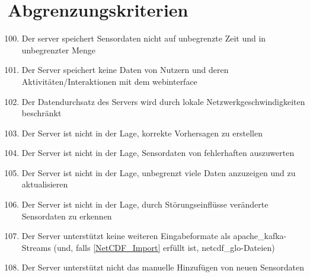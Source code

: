 \section{Abgrenzungskriterien}
\begin{enumerate}[label=\textbf{AK\arabic{enumi}0}]
	\setcounter{enumi}{99}
	\item Der \gls{server} speichert Sensordaten nicht auf unbegrenzte Zeit und in unbegrenzter Menge
	\item Der Server speichert keine Daten von Nutzern und deren Aktivitäten/Interaktionen mit dem \gls{webinterface}
	\item Der Datendurchsatz des Servers wird durch lokale Netzwerkgeschwindigkeiten beschränkt
	\item Der Server ist nicht in der Lage, korrekte Vorhersagen zu erstellen
	\item Der Server ist nicht in der Lage, Sensordaten von fehlerhaften  auszuwerten
	\item Der Server ist nicht in der Lage, unbegrenzt viele Daten anzuzeigen und zu aktualisieren
	\item Der Server ist nicht in der Lage, durch Störungseinflüsse veränderte Sensordaten zu erkennen
	\item Der Server unterstützt keine weiteren Eingabeformate als \gls{apache_kafka}-Streams (und, falls \ref{NetCDF_Import} erfüllt ist, \gls{netcdf_glo}-Dateien)
	\item Der Server unterstützt nicht das manuelle Hinzufügen von neuen Sensordaten
\end{enumerate}